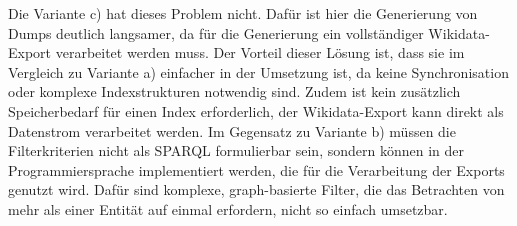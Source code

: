 Die Variante c) hat dieses Problem nicht.
Dafür ist hier die Generierung von Dumps deutlich langsamer, da für die Generierung ein vollständiger Wikidata-Export verarbeitet werden muss.
Der Vorteil dieser Lösung ist, dass sie im Vergleich zu Variante a) einfacher in der Umsetzung ist, da keine Synchronisation oder komplexe Indexstrukturen notwendig sind.
Zudem ist kein zusätzlich Speicherbedarf für einen Index erforderlich, der Wikidata-Export kann direkt als Datenstrom verarbeitet werden.
Im Gegensatz zu Variante b) müssen die Filterkriterien nicht als SPARQL formulierbar sein, sondern können in der Programmiersprache implementiert werden, die für die Verarbeitung der Exports genutzt wird.
Dafür sind komplexe, graph-basierte Filter, die das Betrachten von mehr als einer Entität auf einmal erfordern, nicht so einfach umsetzbar.

